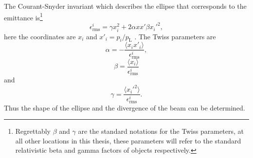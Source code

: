 The Courant-Snyder invariant which describes the ellipse that corresponds to the emittance is\footnote{Regrettably $\beta$ and $\gamma$ are the standard notations for the Twiss parameters, at all other locations in this thesis, these parameters will refer to the standard relativistic beta and gamma factors of objects respectively.}
\begin{equation}
	\epsilon^i_\mathrm{rms}  = \gamma x_i^2 + 2\alpha x x' \beta x_i'^2,
\end{equation}
here the coordinates are $x_i$ and $x'_i = p_i/p_\mathrm{L}$ \cite{wiedemannParticleAcceleratorPhysics2015}. The Twiss parameters are
\begin{equation}
	\alpha = - \frac{\langle x_i x'_i \rangle}{	\epsilon^i_\mathrm{rms} },
\end{equation}
\begin{equation}
	\beta = \frac{\langle x_i \rangle}{	\epsilon^i_\mathrm{rms} }
\end{equation}
and
\begin{equation}
	\gamma = \frac{\langle x_i'^2 \rangle}{	\epsilon^i_\mathrm{rms} }.
\end{equation}
Thus the shape of the ellipse and the divergence of the beam can be determined.



